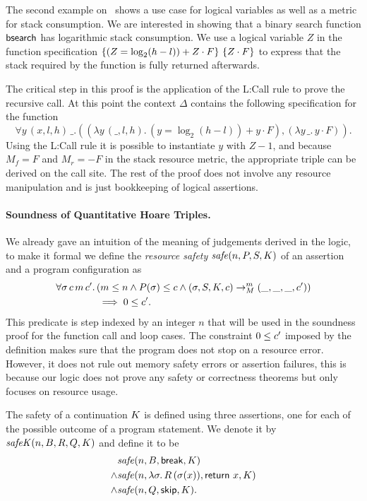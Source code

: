 \documentclass[nocopyrightspace,preprint]{sigplanconf}
\newcommand{\pref}[1]{\prettyref{#1}}
\begin{document}
The second example on~\pref{fig:xmplbs} shows a use case for
logical variables as well as a metric for stack consumption.
We are interested in showing that a binary search function
$\mathsf{bsearch}$ has logarithmic stack consumption.  We use
a logical variable $Z$ in the function specification
$\{(Z = \log_2(h-l)) + Z \cdot F\}\, \, \{Z \cdot F\}$
to express that the stack required by the function is fully
returned afterwards.

The critical step in this proof is the application of the
{\sc L:Call} rule to prove the recursive call.  At this point
the context $\Delta$ contains the following specification
for the function 
$$
  \forall y \, (x,l,h) \, \_.
  ( (\lambda y \, (\_, l, h) .\, (y {=} \log_2(h {-} l)) + y {\cdot} F)
  , (\lambda y \, \_ .\, y {\cdot} F)
  ).
$$
Using the {\sc L:Call} rule it is possible to instantiate
$y$ with $Z - 1$, and because $M_f = F$ and $M_r = -F$ in
the stack resource metric, the appropriate triple can be
derived on the call site.  The rest of the proof does not
involve any resource manipulation and is just bookkeeping
of logical assertions.




\paragraph{Soundness of Quantitative Hoare Triples.}

We already gave an intuition of the meaning of judgements
derived in the logic, to make it formal we define the
\emph{resource safety} $\mathit{safe}(n,P,S,K)$ of an assertion
and a program configuration as
\begin{align*}
  \forall \sigma \, c \, m \, c' .\,&
  (m \le n \land P(\sigma) \le c \land
    (\sigma, S, K, c) \to_{M}^m (\_, \_, \_, c')) \\
  &\implies 0 \le c'.
\end{align*}
This predicate is step indexed by an integer $n$ that will
be used in the soundness proof for the function call and
loop cases.  The constraint $0 \le c'$ imposed by the
definition makes sure that the program does not stop on a
resource error.  However, it does not rule out memory safety
errors or assertion failures, this is because our logic does
not prove any safety or correctness theorems but only
focuses on resource usage.

The safety of a continuation $K$ is defined using three
assertions, one for each of the possible outcome of a program
statement.  We denote it by $\mathit{safeK}(n,B,R,Q,K)$ and define
it to be
\begin{align*}
& \mathit{safe}(n,B,\mathsf{break},K) \\
\land& \mathit{safe}(n,\lambda \sigma.\,R\,(\sigma(x)),\mathsf{return}~x,K) \\
\land& \mathit{safe}(n,Q,\mathsf{skip},K).
\end{align*}
\end{document}

